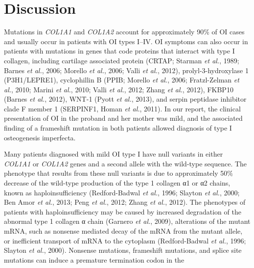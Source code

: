 \section*{Discussion}\par Mutations in \textit{COL1A1} and \textit{COL1A2} account for
                approximately 90\% of OI cases and usually occur in patients with OI types I–IV. OI
                symptoms can also occur in patients with mutations in genes that code proteins that
                interact with type I collagen, including cartilage associated protein (CRTAP; Starman \textit{et al.}, 1989; Barnes \textit{et al.}, 2006; Morello \textit{et al.}, 2006; Valli \textit{et al.}, 2012),
                prolyl-3-hydroxylase 1 (P3H1/LEPRE1), cyclophillin B (PPIB; Morello \textit{et al.}, 2006; Fratzl-Zelman \textit{et al.}, 2010; Marini \textit{et al.}, 2010; Valli \textit{et al.}, 2012; Zhang \textit{et al.}, 2012), FKBP10
                    (Barnes \textit{et al.}, 2012),
                WNT-1 (Pyott \textit{et al.}, 2013),
                and serpin peptidase inhibitor clade F member 1 (SERPINF1, Homan \textit{et al.}, 2011). In our report, the
                clinical presentation of OI in the proband and her mother was mild, and the
                associated finding of a frameshift mutation in both patients allowed diagnosis of
                type I osteogenesis imperfecta.\par Many patients diagnosed with mild OI type I have null variants in either
                    \textit{COL1A1} or \textit{COL1A2} genes and a second allele
                with the wild-type sequence. The phenotype that results from these null variants is
                due to approximately 50\% decrease of the wild-type production of the type 1 collagen
                α1 or α2 chains, known as haploinsufficiency (Redford-Badwal \textit{et al.}, 1996; Slayton \textit{et al.}, 2000; Ben Amor \textit{et al.}, 2013; Peng \textit{et al.}, 2012; Zhang \textit{et al.}, 2012). The phenotypes of
                patients with haploinsufficiency may be caused by increased degradation of the
                abnormal type 1 collagen α chain (Garnero \textit{et
                        al.}, 2009), alterations of the mutant mRNA, such as nonsense
                mediated decay of the mRNA from the mutant allele, or inefficient transport of mRNA
                to the cytoplasm (Redford-Badwal \textit{et
                        al.}, 1996; Slayton
                        \textit{et al.}, 2000). Nonsense mutations, frameshift
                mutations, and splice site mutations can induce a premature termination codon in the

